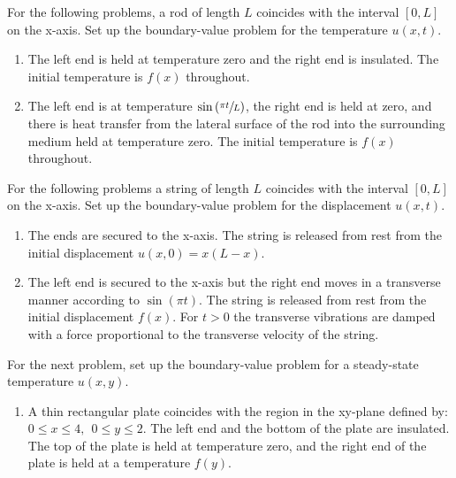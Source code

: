 \begin{fullwidth}
\begin{enumerate}[resume]
\end{enumerate}

\vspace{1.0cm}

\noindent For the following problems, a rod of length $L$ coincides with the interval $[0,L]$ on the x-axis.  Set up the boundary-value problem for the temperature $u(x,t)$.

\begin{enumerate}[resume]
\item The left end is held at temperature zero and the right end is insulated.  The initial temperature is $f(x)$ throughout.

\vspace{1.0cm}

\item The left end is at temperature $\sin{\left(\sfrac{\pi t}{L} \right)}$, the right end is held at zero, and there is heat transfer from the lateral surface of the rod into the surrounding medium held at temperature zero.  The initial temperature is $f(x)$ throughout.
\end{enumerate}

\vspace{1.0cm}

\noindent For the following problems a string of length $L$ coincides with the interval $[0,L]$ on the x-axis.  Set up the boundary-value problem for the displacement $u(x,t)$.

\begin{enumerate}[resume]
\item The ends are secured to the x-axis. The string is released from rest from the initial displacement $u(x,0) = x(L-x)$.  

\vspace{1.0cm}

\item The left end is secured to the x-axis but the right end moves in a transverse manner according to $\sin{(\pi t)}$.  The string is released from rest from the initial displacement $f(x)$.  For $t>0$ the transverse vibrations are damped with a force proportional to the transverse velocity of the string.
\end{enumerate}


\vspace{1.0cm}

\noindent For the next problem, set up the boundary-value problem for a steady-state temperature $u(x,y)$. 

\begin{enumerate}[resume]
\item A thin rectangular plate coincides with the region in the xy-plane defined by: $0\le x \le 4, \ \ 0 \le y \le 2$.  The left end and the bottom of the plate are insulated.  The top of the plate is held at temperature zero, and the right end of the plate is held at a temperature $f(y)$. 
\end{enumerate}

\end{fullwidth}
